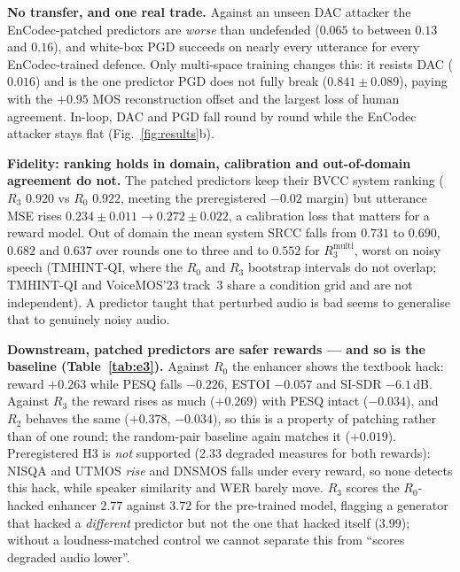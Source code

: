 \documentclass[conference]{IEEEtran}
\begin{document}
\begin{table}[!tb]
\centering
\caption{\textbf{Downstream GRPO enhancement.} Change against the supervised pre-trained enhancer on
VoiceBank-DEMAND test, per reward predictor. Mean$\pm$sd over 3 seeds ($R_2$: one seed).}
\label{tab:e3}
\scriptsize
\setlength{\tabcolsep}{3pt}

\end{table}

\noindent\textbf{No transfer, and one real trade.} Against an unseen DAC attacker the EnCodec-patched predictors
are \emph{worse} than undefended ($0.065$ to between $0.13$ and $0.16$), and white-box PGD succeeds on nearly
every utterance for every EnCodec-trained defence. Only multi-space training changes this: it resists DAC
($0.016$) and is the one predictor PGD does not fully break ($0.841\!\pm\!0.089$), paying with the $+0.95$ MOS
reconstruction offset and the largest loss of human agreement. In-loop, DAC and PGD fall round by round while the
EnCodec attacker stays flat (Fig.~\ref{fig:results}b).

\noindent\textbf{Fidelity: ranking holds in domain, calibration and out-of-domain agreement do not.} The patched
predictors keep their BVCC system ranking ($R_3$ $0.920$ vs $R_0$ $0.922$, meeting the preregistered $-0.02$
margin) but utterance MSE rises $0.234\!\pm\!0.011\to0.272\!\pm\!0.022$, a calibration loss that matters for a
reward model. Out of domain the mean system SRCC falls from $0.731$ to $0.690$, $0.682$ and $0.637$ over rounds
one to three and to $0.552$ for $R_3^{\mathrm{multi}}$, worst on noisy speech (TMHINT-QI, where the $R_0$ and
$R_3$ bootstrap intervals do not overlap; TMHINT-QI and VoiceMOS'23 track~3 share a condition grid and are not
independent). A predictor taught that perturbed audio is bad seems to generalise that to genuinely noisy audio.


\noindent\textbf{Downstream, patched predictors are safer rewards --- and so is the baseline
(Table~\ref{tab:e3}).} Against $R_0$ the enhancer shows the textbook hack: reward $+0.263$ while PESQ falls
$-0.226$, ESTOI $-0.057$ and SI-SDR $-6.1$\,dB. Against $R_3$ the reward rises as much ($+0.269$) with PESQ
intact ($-0.034$), and $R_2$ behaves the same ($+0.378$, $-0.034$), so this is a property of patching rather than
of one round; the random-pair baseline again matches it ($+0.019$). Preregistered H3 is \emph{not} supported (2.33 degraded measures for
both rewards): NISQA and UTMOS \emph{rise} and DNSMOS falls under every reward, so none detects this hack, while
speaker similarity and WER barely move. $R_3$ scores the $R_0$-hacked enhancer $2.77$ against $3.72$ for the pre-trained model, flagging a
generator that hacked a \emph{different} predictor but not the one that hacked itself ($3.99$); without a
loudness-matched control we cannot separate this from ``scores degraded audio lower''.
\end{document}
